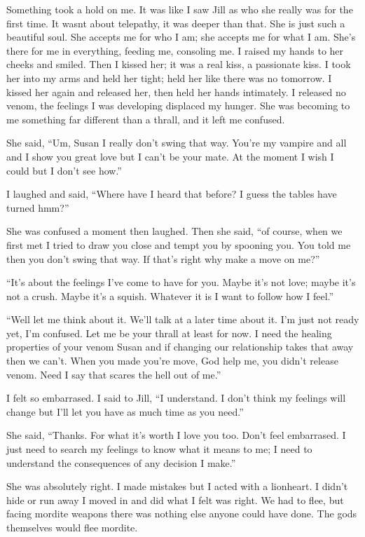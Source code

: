 Something took a hold on me. It was like I saw Jill as who she really was for the first time. It wasnt about telepathy, it was deeper than that. She is just such a beautiful soul. She accepts me for who I am; she accepts me for what I am. She's there for me in everything, feeding me, consoling me. I raised my hands to her cheeks and smiled. Then I kissed her; it was a real kiss, a passionate kiss. I took her into my arms and held her tight; held her like there was no tomorrow. I kissed her again and released her, then held her hands intimately. I released no venom, the feelings I was developing displaced my hunger. She was becoming to me something far different than a thrall, and it left me confused.

She said, ``Um, Susan I really don't swing that way. You're my vampire and all and I show you great love but I can't be your mate. At the moment I wish I could but I don't see how.''

I laughed and said, ``Where have I heard that before? I guess the tables have turned hmm?''

She was confused a moment then laughed. Then she said, ``of course, when we first met I tried to draw you close and tempt you by spooning you. You told me then you don't swing that way. If that's right why make a move on me?''

``It's about the feelings I've come to have for you. Maybe it's not love; maybe it's not a crush. Maybe it's a squish. Whatever it is I want to follow how I feel.''

``Well let me think about it. We'll talk at a later time about it. I'm just not ready yet, I'm confused. Let me be your thrall at least for now. I need the healing properties of your venom Susan and if changing our relationship takes that away then we can't. When you made you're move, God help me, you didn't release venom. Need I say that scares the hell out of me.''

I felt so embarrased. I said to Jill, ``I understand. I don't think my feelings will change but I'll let you have as much time as you need.''

She said, ``Thanks. For what it's worth I love you too. Don't feel embarrased. I just need to search my feelings to know what it means to me; I need to understand the consequences of any decision I make.''

She was absolutely right. I made mistakes but I acted with a lionheart. I didn't hide or run away I moved in and did what I felt was right. We had to flee, but facing mordite weapons there was nothing else anyone could have done. The gods themselves would flee mordite.

